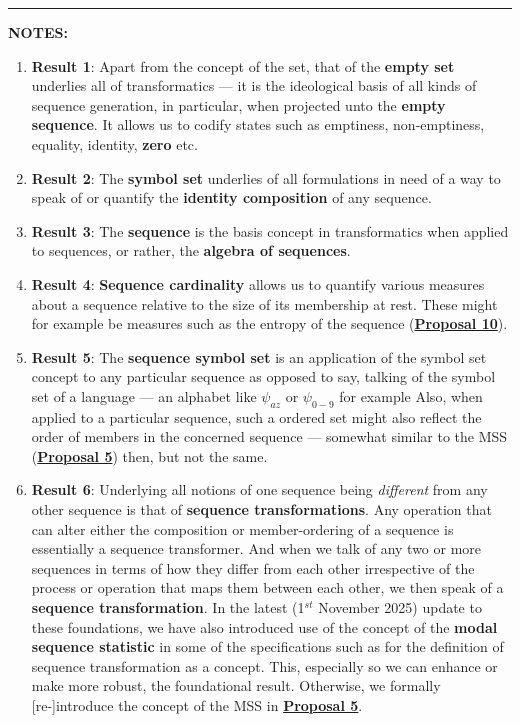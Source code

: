 \documentclass[a4paper, 18pt]{book} %
\begin{document}
{
\noindent\rule{\linewidth}{0.4pt}

\textbf{NOTES:}

\begin{enumerate}
\item \textbf{Result 1}: Apart from the concept of the set, that of the \textbf{empty set} underlies all of transformatics --- it is the ideological basis of all kinds of sequence generation, in particular, when projected unto the \textbf{empty sequence}. It allows us to codify states such as emptiness, non-emptiness, equality, identity, \textbf{zero} etc. 
\item \textbf{Result 2}: The \textbf{symbol set} underlies of all formulations in need of a way to speak of or quantify the \textbf{identity composition} of any sequence.
\item \textbf{Result 3}: The \textbf{sequence} is the basis concept in transformatics when applied to sequences, or rather, the \textbf{algebra of sequences}\cite{treealgebras_review}.
\item \textbf{Result 4}: \textbf{Sequence cardinality} allows us to quantify various measures about a sequence relative to the size of its membership at rest. These might for example be measures such as the entropy of the sequence (\textbf{\hyperref[PROPTOE]{Proposal 10}}).
\item \textbf{Result 5}: The \textbf{sequence symbol set} is an application of the symbol set concept to any particular sequence as opposed to say, talking of the symbol set of a language --- an alphabet like $\psi_{az}$ or $\psi_{0-9}$ for example Also, when applied to a particular sequence, such a ordered set might also reflect the order of members in the concerned sequence --- somewhat similar to the MSS (\textbf{\hyperref[PROP5]{Proposal 5}}) then, but not the same.
\item \textbf{Result 6}: Underlying all notions of one sequence being \textit{different} from any other sequence is that of \textbf{sequence transformations}. Any operation that can alter either the composition or member-ordering of a sequence is essentially a sequence transformer. And when we talk of any two or more sequences in terms of how they differ from each other irrespective of the process or operation that maps them between each other, we then speak of a \textbf{sequence transformation}. In the latest (1$^{st}$ November 2025) update to these foundations, we have also introduced use of the concept of the \textbf{modal sequence statistic} in some of the specifications such as for the definition of sequence transformation as a concept. This, especially so we can enhance or make more robust, the foundational result. Otherwise, we formally [re-]introduce the concept of the MSS in \textbf{\hyperref[PROP5]{Proposal 5}}.

\end{enumerate}}
\end{document}
